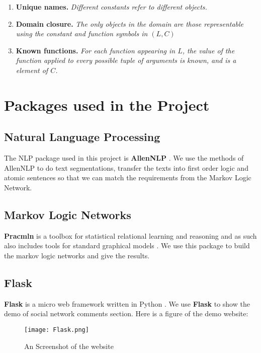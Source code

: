 \documentclass[
12pt, %
a4paper, %
oneside, %
headinclude,footinclude, %
BCOR5mm, %
]{scrartcl}
\begin{document}
\begin{enumerate}[noitemsep]
    \item \textbf{Unique names.} \textit{Different constants refer to different objects.}
    \item \textbf{Domain closure.} \textit{The only objects in the domain are those representable using the constant and function symbols in $(L,C)$}
    \item \textbf{Known functions.} \textit{For each function appearing in $L$, the value of the function applied to every possible tuple of arguments is known, and is a element of $C$.}
\end{enumerate}



\section{Packages used in the Project}
\subsection{Natural Language Processing}
The NLP package used in this project is \textbf{AllenNLP} \cite{Gardner2017AllenNLP}. We use the methods of AllenNLP to do text segmentations, transfer the texts into first order logic and atomic sentences so that we can match the requirements from the Markov Logic Network.

\subsection{Markov Logic Networks}
\textbf{Pracmln} is a toolbox for statistical relational learning and reasoning and as such also includes tools for standard graphical models \cite{pracmln}. We use this package to build the markov logic networks and give the results.
\subsection{Flask}
\textbf{Flask} is a micro web framework written in Python 
\cite{grinberg2018flask}. We use \textbf{Flask} to show the demo of social network comments section. Here is a figure of the demo website:
\begin{figure}[htb]
    \centering 
    \texttt{[image: Flask.png]} 
    \caption[An Screenshot of the website]{An Screenshot of the website} %
    \end{figure}
\end{document}
